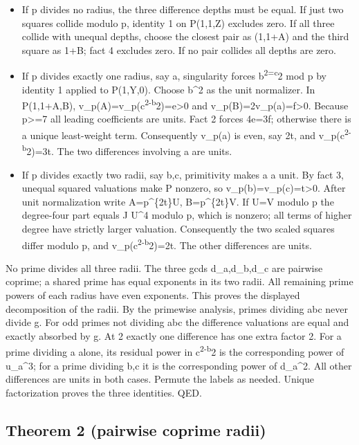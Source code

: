 \documentclass[
  10pt,
]{article}
\providecommand{\tightlist}{%
  \setlength{\itemsep}{0pt}\setlength{\parskip}{0pt}}
\begin{document}
\begin{itemize}
\tightlist
\item
  If p divides no radius, the three difference depths must be equal. If
  just two squares collide modulo p, identity 1 on P(1,1,Z) excludes
  zero. If all three collide with unequal depths, choose the closest
  pair as (1,1+A) and the third square as 1+B; fact 4 excludes zero. If
  no pair collides all depths are zero.
\item
  If p divides exactly one radius, say a, singularity forces
  b\textsuperscript{2=c}2 mod p by identity 1 applied to P(1,Y,0).
  Choose b\^{}2 as the unit normalizer. In P(1,1+A,B),
  v\_p(A)=v\_p(c\textsuperscript{2-b}2)=e\textgreater0 and
  v\_p(B)=2v\_p(a)=f\textgreater0. Because p\textgreater=7 all leading
  coefficients are units. Fact 2 forces 4e=3f; otherwise there is a
  unique least-weight term. Consequently v\_p(a) is even, say 2t, and
  v\_p(c\textsuperscript{2-b}2)=3t. The two differences involving a are
  units.
\item
  If p divides exactly two radii, say b,c, primitivity makes a a unit.
  By fact 3, unequal squared valuations make P nonzero, so
  v\_p(b)=v\_p(c)=t\textgreater0. After unit normalization write
  A=p\^{}\{2t\}U, B=p\^{}\{2t\}V. If U=V modulo p the degree-four part
  equals J U\^{}4 modulo p, which is nonzero; all terms of higher degree
  have strictly larger valuation. Consequently the two scaled squares
  differ modulo p, and v\_p(c\textsuperscript{2-b}2)=2t. The other
  differences are units.
\end{itemize}

No prime divides all three radii. The three gcds d\_a,d\_b,d\_c are
pairwise coprime; a shared prime has equal exponents in its two radii.
All remaining prime powers of each radius have even exponents. This
proves the displayed decomposition of the radii. By the primewise
analysis, primes dividing abc never divide g. For odd primes not
dividing abc the difference valuations are equal and exactly absorbed by
g. At 2 exactly one difference has one extra factor 2. For a prime
dividing a alone, its residual power in c\textsuperscript{2-b}2 is the
corresponding power of u\_a\^{}3; for a prime dividing b,c it is the
corresponding power of d\_a\^{}2. All other differences are units in
both cases. Permute the labels as needed. Unique factorization proves
the three identities. QED.

\subsection{Theorem 2 (pairwise coprime
radii)}\label{theorem-2-pairwise-coprime-radii}
\end{document}
